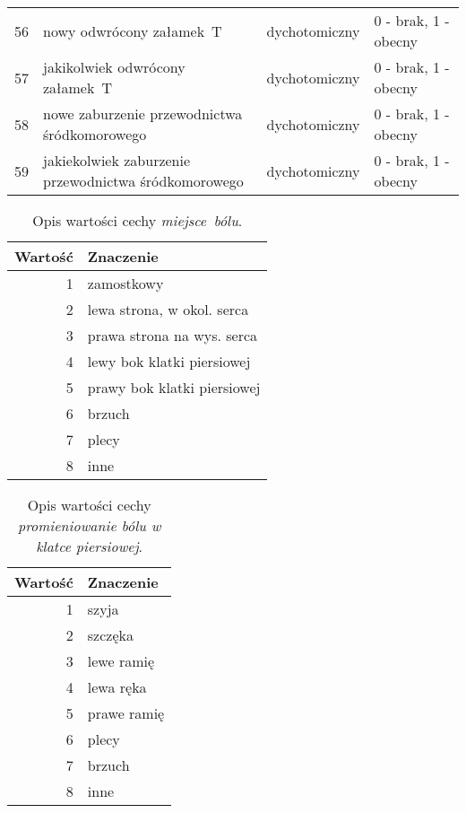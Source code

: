 \begin{longtabu}{rX[l]ll}
    56            & nowy odwrócony załamek~T                              & dychotomiczny        & 0 - brak, 1 - obecny      \\
    57            & jakikolwiek odwrócony załamek~T                       & dychotomiczny        & 0 - brak, 1 - obecny      \\
    58            & nowe zaburzenie przewodnictwa śródkomorowego          & dychotomiczny        & 0 - brak, 1 - obecny      \\
    59            & jakiekolwiek zaburzenie przewodnictwa śródkomorowego  & dychotomiczny        & 0 - brak, 1 - obecny      \\
    \bottomrule
\end{longtabu}

\begin{table}[H]
    \caption{Opis wartości cechy \textit{miejsce~bólu}.}\label{tab:cecha_3}
    \begin{tabu}{rX[l]}
        \toprule
        \textbf{Wartość} & \textbf{Znaczenie}          \\
        \midrule

        1                & zamostkowy                  \\
        2                & lewa strona, w okol. serca  \\
        3                & prawa strona na wys. serca  \\
        4                & lewy bok klatki piersiowej  \\
        5                & prawy bok klatki piersiowej \\
        6                & brzuch                      \\
        7                & plecy                       \\
        8                & inne                        \\
        \bottomrule
    \end{tabu}
\end{table}

\begin{table}[H]
    \caption{Opis wartości cechy \textit{promieniowanie bólu w klatce piersiowej}.}\label{tab:cecha_4}
    \begin{tabu}{rX[l]}
        \toprule
        \textbf{Wartość} & \textbf{Znaczenie} \\
        \midrule

        1                & szyja              \\
        2                & szczęka            \\
        3                & lewe ramię         \\
        4                & lewa ręka          \\
        5                & prawe ramię        \\
        6                & plecy              \\
        7                & brzuch             \\
        8                & inne               \\
        \bottomrule
    \end{tabu}
\end{table}


